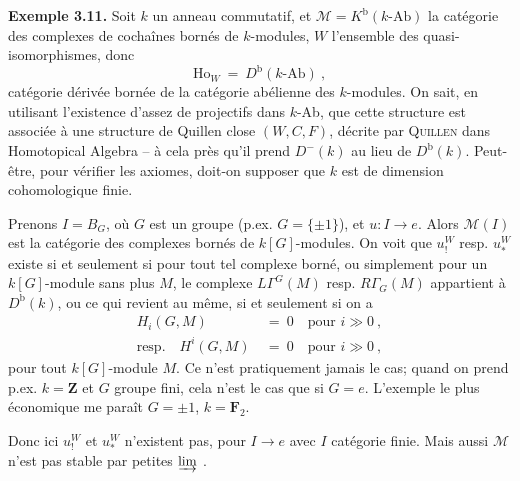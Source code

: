 \documentclass[11pt]{article}
\newcommand{\printedpage}[1]{\marginpar{\footnotesize p.~#1}}
\newcommand{\msp}[1]{\marginpar{\footnotesize [#1]}}
\newcommand{\Ho}{\mathrm{Ho}}
\newcommand{\limind}{\varinjlim}
\begin{document}
\textbf{Exemple 3.11.} Soit $k$ un anneau commutatif, et $\mathcal{M}=K^{\mathrm{b}}(k\text{-Ab})$ la catégorie des complexes de cochaînes bornés de $k$-modules, $W$ l'ensemble des quasi-isomorphismes, donc
\[
\Ho_W \ = \ D^{\mathrm{b}}(k\text{-Ab}) \ ,
\]
catégorie dérivée bornée de la catégorie abélienne des $k$-modules. On sait, en utilisant l'existence d'assez de projectifs dans $k$-Ab, que cette structure est associée à une structure de Quillen close $(W,C,F)$, décrite par \textsc{Quillen}
\msp{page 45}
dans Homotopical Algebra -- à cela près qu'il prend $D^-(k)$ au lieu de $D^{\mathrm{b}}(k)$. Peut-être, pour vérifier les axiomes, doit-on supposer que $k$ est de dimension cohomologique finie.

Prenons $I=B_G$, où $G$ est un groupe (p.ex. $G=\{\pm1\}$), et $u : I \longrightarrow e$. Alors $\mathcal{M}(I)$ est la catégorie des complexes bornés de $k[G]$-modules. On voit que $u_!^W$ resp. $u_*^W$ existe si et seulement si pour tout tel complexe borné, ou simplement pour un $k[G]$-module sans plus $M$, le complexe $L\Gamma^G(M)$ resp. $R\Gamma_G(M)$ appartient à $D^{\mathrm{b}}(k)$, ou ce qui revient au même,
\printedpage{25}
si et seulement si on a
\[
\begin{aligned}
H_i(G,M) \ &= \ 0 \quad \text{pour } i \gg 0 \ ,\\
\text{resp.}\quad H^i(G,M) \ &= \ 0 \quad \text{pour } i \gg 0 \ ,
\end{aligned}
\]
pour tout $k[G]$-module $M$. Ce n'est pratiquement jamais le cas; quand on prend p.ex. $k=\mathbf{Z}$ et $G$ groupe fini, cela n'est le cas que si $G=e$. L'exemple le plus économique me paraît $G=\pm1$, $k=\mathbf{F}_2$.

\msp{page 46}
Donc ici $u_!^W$ et $u_*^W$ n'existent pas, pour $I \longrightarrow e$ avec $I$ catégorie finie. Mais aussi $\mathcal{M}$ n'est pas stable par petites $\limind$ .
\end{document}
